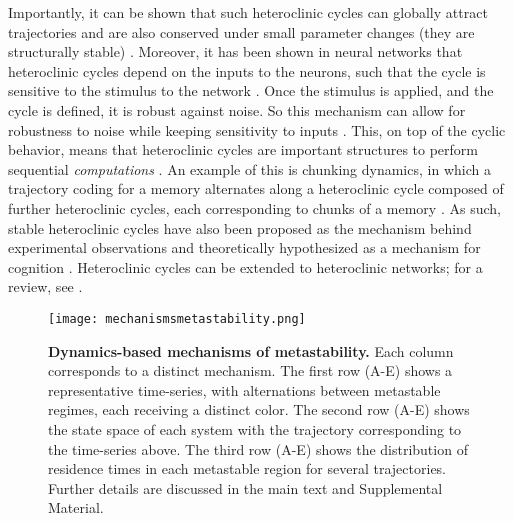 Importantly, it can be shown that such heteroclinic cycles can globally attract trajectories \cite{nowotny2007dynamical} and are also conserved under small parameter changes (they are structurally stable) \cite{rabinovich2008transientcognitive}.  Moreover, it has been shown in neural networks that heteroclinic cycles depend on the inputs to the neurons, such that the cycle is sensitive to the stimulus to the network \cite{rabinovich2001dynamical}. Once the stimulus is applied, and the cycle is defined, it is robust against noise. So this mechanism can allow for robustness to noise while keeping sensitivity to inputs \cite{rabinovich2001dynamical, rabinovich2008transientcognitive}. This, on top of the cyclic behavior, means that heteroclinic cycles are important structures to perform sequential \textit{computations} \cite{fonollosa2015learning}.
An example of this is chunking dynamics, in which a trajectory coding for a memory alternates along a heteroclinic cycle composed of further heteroclinic cycles, each corresponding to chunks of a memory \cite{fonollosa2015learning}. As such, stable heteroclinic cycles have also been proposed as the mechanism behind experimental observations \cite{rabinovich2008transientcognitive, rabinovich2008transientdynamics, rabinovich2012information} and theoretically hypothesized as a mechanism for cognition \cite{fonollosa2015learning, rabinovich2014chunking}. Heteroclinic cycles can be extended to heteroclinic networks; for a review, see \cite{hildegard2023heteroclinic}. 
%
\begin{figure*}[hbt]
    \centering
    \texttt{[image: mechanismsmetastability.png]}
    \caption{\textbf{Dynamics-based mechanisms of metastability.} Each column corresponds to a distinct mechanism. The first row (A-E) shows a representative time-series, with alternations between metastable regimes, each receiving a distinct color. The second row (A\supprime-E\supprime) shows the state space of each system with the trajectory corresponding to the time-series above. The third row (A\ssupprime-E\ssupprime) shows the distribution of residence times in each metastable region for several trajectories. Further details are discussed in the main text and Supplemental Material.}
    \label{fig:mechanismsmetastability}
\end{figure*}

